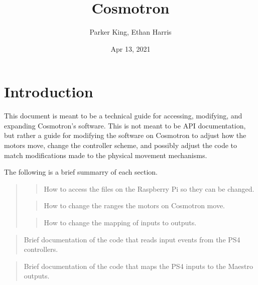 \documentclass[letterpaper,10pt,english]{sphinxmanual}
\title{Cosmotron}
\date{Apr 13, 2021}
\author{Parker King, Ethan Harris}
\begin{document}
\pagestyle{empty}
\sphinxmaketitle
\pagestyle{plain}
\sphinxtableofcontents
\pagestyle{normal}
\label{\detokenize{index::doc}}



\chapter{Introduction}
\label{\detokenize{intro:introduction}}\label{\detokenize{intro::doc}}
\sphinxAtStartPar
This document is meant to be a technical guide for accessing,
modifying, and expanding Cosmotron’s software. This is not meant
to be API documentation, but rather a guide for modifying the
software on Cosmotron to adjust how the motors move, change the
controller scheme, and possibly adjust the code to match
modifications made to the physical movement mechanisms.

\sphinxAtStartPar
The following is a brief summarry of each section.

\sphinxAtStartPar
{}
\begin{quote}

\sphinxAtStartPar
{}
\begin{quote}

\sphinxAtStartPar
How to access the files on the Raspberry Pi so they can be changed.
\end{quote}

\sphinxAtStartPar
{}
\begin{quote}

\sphinxAtStartPar
How to change the ranges the motors on Cosmotron move.
\end{quote}

\sphinxAtStartPar
{}
\begin{quote}

\sphinxAtStartPar
How to change the mapping of inputs to outputs.
\end{quote}
\end{quote}

\sphinxAtStartPar
{}
\begin{quote}

\sphinxAtStartPar
Brief documentation of the code that reads input events from the PS4 controllers.
\end{quote}

\sphinxAtStartPar
{}
\begin{quote}

\sphinxAtStartPar
Brief documentation of the code that maps the PS4 inputs to the Maestro outputs.
\end{quote}
\end{document}
